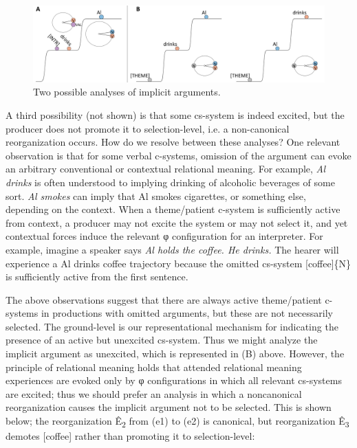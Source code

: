   
\begin{figure}
\includegraphics[width=\textwidth]{figures/Tilsen-img86.png}
\caption{Two possible analyses of implicit arguments.}
\label{fig:4:36}
\end{figure}
 

  A third possibility (not shown) is that some cs-system is indeed excited, but the producer does not promote it to selection-level, i.e. a non-canonical reorganization occurs. How do we resolve between these analyses? One relevant observation is that for some verbal c-systems, omission of the argument can evoke an arbitrary conventional or contextual relational meaning. For example, \textit{Al drinks} is often understood to implying drinking of alcoholic beverages of some sort. \textit{Al smokes} can imply that Al smokes cigarettes, or something else, depending on the context. When a theme/patient c-system is sufficiently active from context, a producer may not excite the system or may not select it, and yet contextual forces induce the relevant φ configuration for an interpreter. For example, imagine a speaker says \textit{Al holds the coffee. He drinks.} The hearer will experience a {\textbar}Al drinks coffee{\textbar} trajectory because the omitted cs-system [coffee]\{N\} is sufficiently active from the first sentence.

  The above observations suggest that there are always active theme/patient c-systems in productions with omitted arguments, but these are not necessarily selected. The ground-level is our representational mechanism for indicating the presence of an active but unexcited cs-system. Thus we might analyze the implicit argument as unexcited, which is represented in (B) above. However, the principle of relational meaning holds that attended relational meaning experiences are evoked only by φ configurations in which all relevant cs-systems are excited; thus we should prefer an analysis in which a noncanonical reorganization causes the implicit argument not to be selected. This is shown below; the reorganization Ê\textsubscript{2} from (e1) to (e2) is canonical, but reorganization Ê\textsubscript{3} demotes [coffee] rather than promoting it to selection-level:

